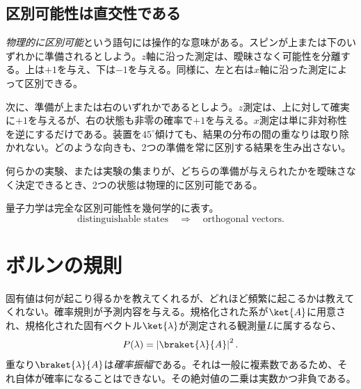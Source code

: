 \subsection{区別可能性は直交性である}

\emph{物理的に区別可能}という語句には操作的な意味がある。スピンが上または下のいずれかに準備されるとしよう。\(z\)軸に沿った測定は、曖昧さなく可能性を分離する。上は\(+1\)を与え、下は\(-1\)を与える。同様に、左と右は\(x\)軸に沿った測定によって区別できる。

次に、準備が上または右のいずれかであるとしよう。\(z\)測定は、上に対して確実に\(+1\)を与えるが、右の状態も非零の確率で\(+1\)を与える。\(x\)測定は単に非対称性を逆にするだけである。装置を\(45^\circ\)傾けても、結果の分布の間の重なりは取り除かれない。どのような向きも、2つの準備を常に区別する結果を生み出さない。

\begin{definition}
何らかの実験、または実験の集まりが、どちらの準備が与えられたかを曖昧さなく決定できるとき、2つの状態は物理的に区別可能である。
\end{definition}

量子力学は完全な区別可能性を幾何学的に表す。
\begin{equation}
\text{distinguishable states}
\quad\Longrightarrow\quad
\text{orthogonal vectors}.
\end{equation}

\begin{classroomqa}
\end{classroomqa}

\section{ボルンの規則}

固有値は何が起こり得るかを教えてくれるが、どれほど頻繁に起こるかは教えてくれない。確率規則が予測内容を与える。規格化された系が\(\ket{A}\)に用意され、規格化された固有ベクトル\(\ket{\lambda}\)が測定される観測量\(L\)に属するなら、
\begin{equation}
P(\lambda)=\left|\braket{\lambda}{A}\right|^2.
\label{eq:l4-born-rule}
\end{equation}
重なり\(\braket{\lambda}{A}\)は\emph{確率振幅}である。それは一般に複素数であるため、それ自体が確率になることはできない。その絶対値の二乗は実数かつ非負である。

